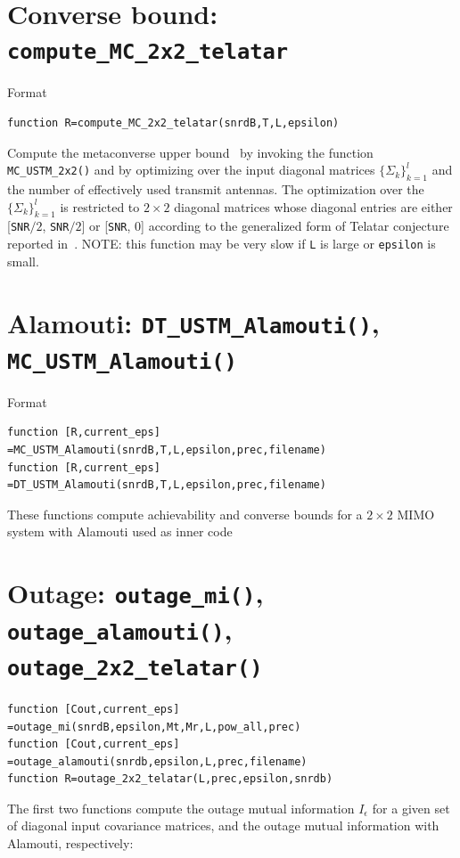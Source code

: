 \documentclass[a4paper,11p]{memoir}
\def\tfdiv{l}  %
\begin{document}
\section[Converse bound]{Converse bound: \texttt{compute\_MC\_2x2\_telatar}}
Format
%
\begin{verbatim}
function R=compute_MC_2x2_telatar(snrdB,T,L,epsilon)
\end{verbatim}
%
Compute the metaconverse upper bound~\cite[Eq.~(41)]{durisi14-12a} by invoking the function \texttt{MC\_USTM\_2x2()} and by optimizing over the input diagonal matrices $\{\Sigma_k\}_{k=1}^{\tfdiv}$ and the number of effectively used transmit antennas.
The optimization over the $\{\Sigma_k\}_{k=1}^{\tfdiv}$ is restricted to $2\times 2$ diagonal matrices whose diagonal entries are either [\verb|SNR|$/2$, \verb|SNR|$/2$]  or [\verb|SNR|, 0] according to the generalized form of Telatar conjecture reported in~\cite[Eq.~(42)]{durisi14-12a}.
NOTE: this function may be very slow if \verb|L| is large or \verb|epsilon| is small. 





\section[Alamouti]{Alamouti: \texttt{DT\_USTM\_Alamouti()}, \texttt{MC\_USTM\_Alamouti()}} %
\label{sec:alamouti}

Format
%
\begin{verbatim}
function [R,current_eps]
=MC_USTM_Alamouti(snrdB,T,L,epsilon,prec,filename)
function [R,current_eps]
=DT_USTM_Alamouti(snrdB,T,L,epsilon,prec,filename)
\end{verbatim}
%
These functions compute achievability and converse bounds for a $2\times 2$ MIMO system with Alamouti used as inner code
%
%
\section[Outage capacity]{Outage: \texttt{outage\_mi()}, \texttt{outage\_alamouti()}, \texttt{outage\_2x2\_telatar()} } %
\label{sec:outage}
%
\begin{verbatim}
function [Cout,current_eps]
=outage_mi(snrdB,epsilon,Mt,Mr,L,pow_all,prec)  
function [Cout,current_eps]
=outage_alamouti(snrdb,epsilon,L,prec,filename)  
function R=outage_2x2_telatar(L,prec,epsilon,snrdb)
\end{verbatim}
%
The first two functions  compute the outage mutual information $I_{\epsilon}$ for a given set of diagonal input covariance matrices, and the outage mutual
information with Alamouti, respectively:
\end{document}
